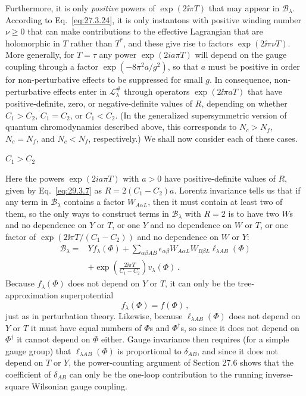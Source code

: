 Furthermore, it is only \emph{positive} powers of \(\exp(2\ii\pi T)\) that
may appear in \(\mathcal{B}_\lambda\). According to
Eq.~\eqref{eq:27.3.24}, it is only instantons with positive winding number
\(\nu\geq0\) that can make contributions to the effective Lagrangian that
are holomorphic in \(T\) rather than \(T^*\), and these give rise to
factors \(\exp(2\ii\pi\nu T)\). More generally, for \(T=\tau\) any power
\(\exp(2ia\pi T)\) will depend on the gauge coupling through a factor
\(\exp(-8\pi^2a/g^2)\), so that \(a\) must be positive in order for
non-perturbative effects to be suppressed for small \(g\). In consequence,
non-perturbative effects enter in \(\mathcal{L}^{\#}_\lambda\) through
operators \(\exp(2\ii\pi aT)\) that have positive-definite, zero, or
negative-definite values of \(R\), depending on whether \(C_1>C_2\),
\(C_1=C_2\), or \(C_1<C_2\). (In the generalized supersymmetric version
of quantum chromodynamics described above, this corresponds to \(N_c>N_f\),
\(N_c=N_f\), and \(N_c<N_f\), respectively.) We shall now consider each
of these cases.

\begin{center}
  \(C_1>C_2\)
\end{center}

Here the powers \(\exp(2ia\pi T)\) with \(a>0\) have positive-definite
values of \(R\), given by Eq.~\eqref{eq:29.3.7} as
\(R=2(C_1-C_2)a\). Lorentz invariance tells us that if any term in
\(\mathcal{B}_\lambda\) contains a factor \(W_{A\alpha L}\), then it must
contain at least two of them, so the only ways to construct terms in
\(\mathcal{B}_\lambda\) with \(R=2\) is to have two \(W\)s and no
dependence on \(Y\) or \(T\), or one \(Y\) and no dependence on \(W\) or
\(T\), or one factor of \(\exp(2\ii\pi T/(C_1-C_2))\) and no dependence
on \(W\) or \(Y\):
\begin{equation}
  \begin{aligned}
  \mathcal{B}_\lambda
  ={}&
  Yf_\lambda(\Phi)
  +\sum_{\alpha\beta AB}
  \epsilon_{\alpha\beta}W_{A\alpha L}W_{B\beta L}
  \ell_{\lambda AB}(\Phi)
  \\
  &+\exp\left(\frac{2\ii\pi T}{C_1-C_2}\right)v_\lambda(\Phi)\,.
  \end{aligned}
  \tag{29.3.9}\label{eq:29.3.9}
\end{equation}
Because \(f_\lambda(\Phi)\) does not depend on \(Y\) or \(T\), it can only
be the tree-approximation superpotential
\begin{equation}
  f_\lambda(\Phi)=f(\Phi)\,,
  \tag{29.3.10}\label{eq:29.3.10}
\end{equation}
just as in perturbation theory. Likewise, because
\(\ell_{\lambda AB}(\Phi)\) does not depend on \(Y\) or \(T\) it must
have equal numbers of \(\Phi\)s and \(\Phi^\dagger\)s, so since it does
not depend on \(\Phi^\dagger\) it cannot depend on \(\Phi\) either. Gauge
invariance then requires (for a simple gauge group) that
\(\ell_{\lambda AB}(\Phi)\) is proportional to \(\delta_{AB}\), and since
it does not depend on \(T\) or \(Y\), the power-counting argument of
Section 27.6 shows that the coefficient of \(\delta_{AB}\) can only be the
one-loop contribution to the running inverse-square Wilsonian gauge
coupling.

